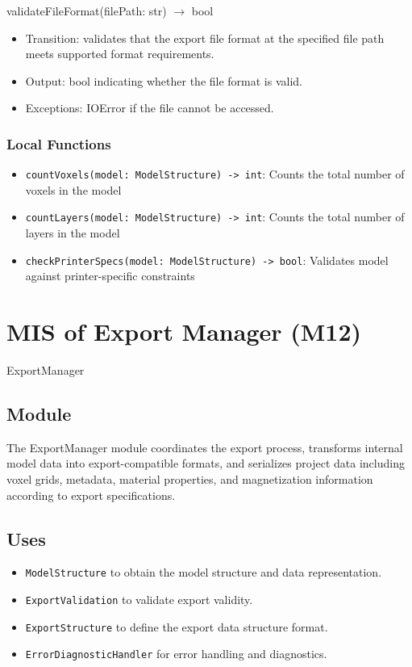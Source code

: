\documentclass[12pt, titlepage]{article}
\begin{document}
validateFileFormat(filePath: str) $\rightarrow$ bool
\begin{itemize}
  \item Transition: validates that the export file format at the specified file path meets supported format requirements.
  \item Output: bool indicating whether the file format is valid.
  \item Exceptions: IOError if the file cannot be accessed.
\end{itemize}


\subsubsection{Local Functions}

\begin{itemize}
\item \texttt{countVoxels(model: ModelStructure) -> int}: Counts the total number of voxels in the model
\item \texttt{countLayers(model: ModelStructure) -> int}: Counts the total number of layers in the model
\item \texttt{checkPrinterSpecs(model: ModelStructure) -> bool}: Validates model against printer-specific constraints
\end{itemize}

\newpage

\section{MIS of Export Manager (M12)}\label{Module15} 

ExportManager

\subsection{Module}

The ExportManager module coordinates the export process, transforms internal model data into export-compatible formats, and serializes project data including voxel grids, metadata, material properties, and magnetization information according to export specifications.

\subsection{Uses}
\begin{itemize}
  \item \texttt{ModelStructure} to obtain the model structure and data representation.
  \item \texttt{ExportValidation} to validate export validity.
  \item \texttt{ExportStructure} to define the export data structure format.
  \item \texttt{ErrorDiagnosticHandler} for error handling and diagnostics.
\end{itemize}
\end{document}

